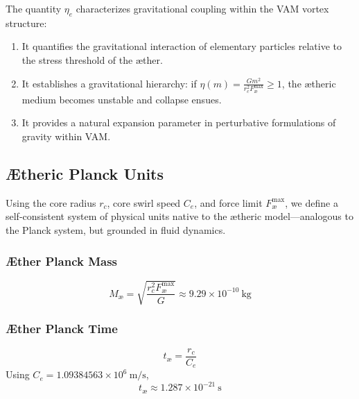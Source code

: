 \documentclass[preprint]{revtex4-2}
\begin{document}
                The quantity \( \eta_e \) characterizes gravitational coupling within the VAM vortex structure:

                \begin{enumerate}
                    \item It quantifies the gravitational interaction of elementary particles relative to the stress threshold of the æther.
                    \item It establishes a gravitational hierarchy: if \( \eta(m) = \frac{G m^2}{r_c^2 F_{\text{\ae}}^{\text{max}}} \geq 1 \), the ætheric medium becomes unstable and collapse ensues.
                    \item It provides a natural expansion parameter in perturbative formulations of gravity within VAM.
                \end{enumerate}

                \subsection*{Ætheric Planck Units}

                Using the core radius \( r_c \), core swirl speed \( C_e \), and force limit \( F_{\text{\ae}}^{\text{max}} \), we define a self-consistent system of physical units native to the ætheric model—analogous to the Planck system, but grounded in fluid dynamics.

                \subsubsection*{Æther Planck Mass}
                \begin{equation}
                M_{\text{\ae}} = \sqrt{\frac{r_c^2 F_{\text{\ae}}^{\text{max}}}{G}} \approx \boxed{9.29 \times 10^{-10}~\text{kg}}
                \end{equation}

                \subsubsection*{Æther Planck Time}
                \begin{equation}
                t_{\text{\ae}} = \frac{r_c}{C_e}
                \end{equation}
                Using \( C_e = 1.09384563 \times 10^6~\text{m/s} \),
                \begin{equation}
                t_{\text{\ae}} \approx \boxed{1.287 \times 10^{-21}~\text{s}}
                \end{equation}
\end{document}
